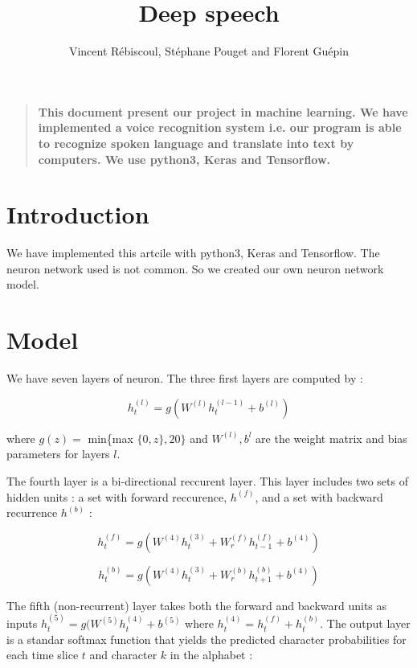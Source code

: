\documentclass[12pt]{article}
\title{Deep speech}
\author
{Vincent R\'ebiscoul, St\'ephane Pouget and Florent Gu\'epin}
\date{}
\newenvironment{sciabstract}{%
\begin{quote} \bf}
{\end{quote}}
\begin{document}
 


\baselineskip24pt


\maketitle 




\begin{sciabstract}
  This document present our project in machine learning. We have implemented a voice recognition system i.e. our program is able to recognize spoken language and translate into text by computers.
 We use python3, Keras and Tensorflow.
\end{sciabstract}



\section*{Introduction}

We have implemented this artcile \cite{article} with python3, Keras and Tensorflow. The neuron network used is not common. So we created our own neuron network model.

\section*{Model}
We have seven layers of neuron. The three first layers are computed by :

\[ h_t^{(l)} = g(W^{(l)}h_t^{(l-1)} + b^{(l)}) \]

where $g(z) =$ min\{max $\{0,z\}, 20\}$ and $W^{(l)}, b^{l}$ are the weight matrix and bias parameters for layers $l$.

The fourth layer is a bi-directional reccurent layer. This layer includes two sets of hidden units : a set with forward reccurence, $h^{(f)}$, and a set with backward recurrence $h^{(b)}$ : 

\[ h_t^{(f)} = g(W^{(4)}h_t^{(3)} + W_r^{(f)}h_{t-1}^{(f)} + b^{(4)}) \]

\[ h_t^{(b)} = g(W^{(4)}h_t^{(3)} + W_r^{(b)}h_{t+1}^{(b)} + b^{(4)}) \]

The fifth (non-recurrent) layer takes both the forward and backward units as inputs $h_t^{(5)} = g(W^{(5)}h_t^{(4)} + b^{(5)} $ where $h_t^{(4)} = h_t^{(f)} + h_t^{(b)}$. The output layer is a standar softmax function that yields the predicted character probabilities for each time slice $t$ and character $k$ in the alphabet :
\end{document}
